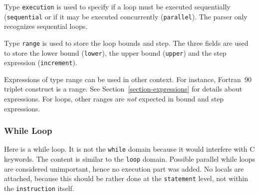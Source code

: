 \documentclass[a4paper]{article}
\begin{document}

Type \texttt{execution} is used to specify if a loop must be executed
sequentially (\texttt{sequential} or if it may be executed concurrently
(\texttt{parallel}). The parser only
recognizes sequential loops.

\begin{comment}
Le domain \verb/execution/ d�finit la s�mantique d'une boucle:
\verb/sequential/ correspond � une boucle DO classique, \verb/parallel/
d�finit un boucle dont les instances d'it�ration peuvent �tre
ex�cut�es en parall�le.
\end{comment}

\label{range}
{}

Type \verb/range/ is used to store the loop bounds and step. The three
fields are used to store the lower bound (\verb/lower/), the upper bound
(\verb/upper/) and the step expression (\verb/increment/).

\begin{comment}
Le domaine \verb/range/ permet de repr�senter les bornes des boucles DO
Fortran. Il y a trois sous-domaines \verb/lower/, \verb/upper/ et \verb/increment/ de
type \verb/expression/ qui sont respectivement la borne inf�rieure, la borne
sup�rieure et l'incr�ment.
\end{comment}

Expressions of type range can be used in other context. For instance,
Fortran~90 triplet construct is a range. See
Section~\ref{section-expressions} for details about expressions. For
loops, other ranges are \emph{not} expected in bound and step expressions.


\subsubsection{While Loop}
\label{subsubsection-whileloop}



Here is a while loop. It is not the \verb|while| domain because it would
interfere with C keywords. The content is similar to the \verb|loop|
domain. Possible parallel while loops are considered unimportant, hence no
execution part was added. No locals are attached, because this should be
rather done at the \verb|statement| level, not within the
\verb|instruction| itself.
\end{document}
